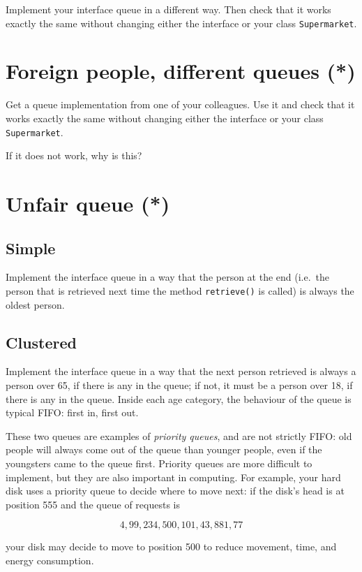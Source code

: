 \documentclass{article}
\begin{document}
Implement your interface queue in a different way. Then check that it
works exactly the same without changing either the interface or your
class \verb+Supermarket+. 

\section{Foreign people, different queues (*)}
\label{sec:fore-people-diff}

Get a queue implementation from one of your colleagues. Use it and
check that it works exactly the same without changing either the
interface or your class \verb+Supermarket+. 

If it does not work, why is this?

\section{Unfair queue (*)}
\label{sec:unfair-queue-}

\subsection{Simple}
\label{sec:simple}

Implement the interface queue in a way that the person at the end
(i.e.~the person that is retrieved next time the method
\verb+retrieve()+ is called) is always the oldest person. 

\subsection{Clustered}
\label{sec:clustered}

Implement the interface queue in a way that the next person retrieved
is always a person over 65, if there is any in the queue; if not, it
must be a person over 18, if there is any in the queue. Inside each
age category, the behaviour of the queue is typical FIFO: first in,
first out. 

These two queues are examples of \emph{priority queues}, and are not
strictly FIFO: old people will always come out of the queue than
younger people, even if the youngsters came to the queue
first. Priority queues are more difficult to implement, but they are
also important in computing. For example, your hard disk uses a
priority queue to decide where to move next: if the disk's head is at
position 555 and the queue of requests is

$$4, 99, 234, 500, 101, 43, 881, 77$$

your disk may decide to move to position
500 to reduce movement, time, and energy consumption.
\end{document}
